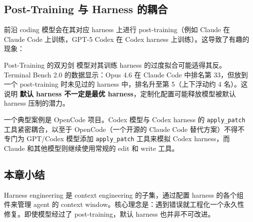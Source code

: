 \subsection{Post-Training 与 Harness 的耦合}

前沿 coding 模型会在其对应 harness 上进行 post-training（例如 Claude 在 Claude Code 上训练，GPT-5 Codex 在 Codex harness 上训练）。这导致了有趣的现象：

\begin{warningbox}{Post-Training 的双刃剑}
模型对其训练 harness 的过度拟合可能适得其反。Terminal Bench 2.0 的数据显示：Opus 4.6 在 Claude Code 中排名第 33，但放到一个 post-training 时未见过的 harness 中，排名升至第 5（上下浮动约 4 名）。这说明 \textbf{默认 harness 不一定是最优 harness}，定制化配置可能释放模型被默认 harness 压制的潜力。
\end{warningbox}

一个典型案例是 OpenCode 项目。Codex 模型与 Codex harness 的 \texttt{apply\_patch} 工具紧密耦合，以至于 OpenCode（一个开源的 Claude Code 替代方案）不得不专门为 GPT/Codex 模型添加 \texttt{apply\_patch} 工具来模拟 Codex harness，而 Claude 和其他模型则继续使用常规的 edit 和 write 工具。

\subsection{本章小结}

Harness engineering 是 context engineering 的子集，通过配置 harness 的各个组件来管理 agent 的 context window。核心理念是：遇到错误就工程化一个永久性修复。即使模型经过了 post-training，默认 harness 也并非不可改进。


